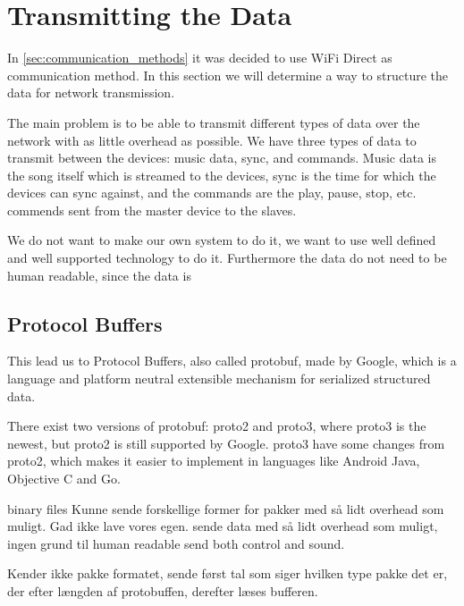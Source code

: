\section{Transmitting the Data}
In \cref{sec:communication_methods} it was decided to use WiFi Direct as communication method.
In this section we will determine a way to structure the data for network transmission.

\bigskip

The main problem is to be able to transmit different types of data over the network with as little overhead as possible.
We have three types of data to transmit between the devices: music data, sync, and commands. 
Music data is the song itself which is streamed to the devices, sync is the time for which the devices can sync against, and the commands are the play, pause, stop, etc. commends sent from the master device to the slaves. 

We do not want to make our own system to do it, we want to use well defined and well supported technology to do it.
Furthermore the data do not need to be human readable, since the data is 

\subsection{Protocol Buffers}
This lead us to Protocol Buffers, also called protobuf, made by Google, which is a language and platform neutral extensible mechanism for serialized structured data. 


There exist two versions of protobuf: proto2 and proto3, where proto3 is the newest, but proto2 is still supported by Google\cite{proto3}.
proto3 have some changes from proto2, which makes it easier to implement in languages like Android Java, Objective C and Go\cite{proto3}.





\bigskip

binary files
Kunne sende forskellige former for pakker med så lidt overhead som muligt.
Gad ikke lave vores egen.
sende data med så lidt overhead som muligt, ingen grund til human readable
send both control and sound.


Kender ikke pakke formatet, sende først tal som siger hvilken type pakke det er, der efter længden af protobuffen, derefter læses bufferen.
